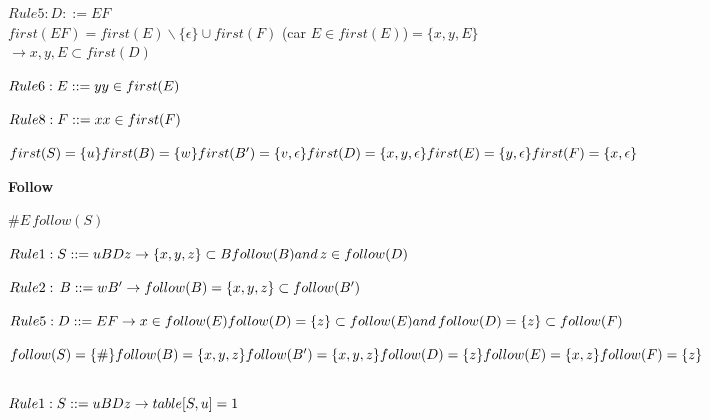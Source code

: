             $Rule 5: D::= EF$\\
            $first(EF) = first(E) \backslash \{\epsilon\} \cup first(F)$ (car $E\in first(E)$)$=\{x,y,E\}$\\
            $\rightarrow {x,y,E} \subset first(D)$
            
            $Rule 6: E::= y\\
            y \in first(E)$
            
            $Rule 8: F::=x\\
            x \in first(F)$
            
            $first(S) = \{u\}\\
            first(B) = \{w\}\\
            first(B') = \{v,\epsilon\}\\
            first(D) = \{x,y,\epsilon\}\\
            first(E) = \{y,\epsilon\}\\
            first(F) = \{x, \epsilon\}$
            
            \textbf{Follow}
            
            $\#E \, follow(S)$
            
            $Rule 1: S::= uBDz\\
            \rightarrow \{x,y,z\} \subset B follow(B)\\
            and \, z \in follow(D)$
            
            $Rule 2: \, B::= wB'\\
            \rightarrow follow(B)=\{x,y,z\} \subset follow(B')$
            
            $Rule 5: D::=EF\\
            \rightarrow x \in follow(E)\\
            follow(D) = \{z\} \subset follow(E)\\
            and \, follow(D) = \{z\} \subset follow(F)$
             
            $follow(S) = \{\#\}\\
            follow(B) = \{x,y,z\}\\
            follow(B') = \{x,y,z\}\\
            follow(D) = \{z\}\\
            follow(E) = \{x,z\}\\
            follow(F) = \{z\}$
\subsection{}
          $Rule 1: S::= uBDz\\
            \rightarrow table[S,u] = 1$
            
